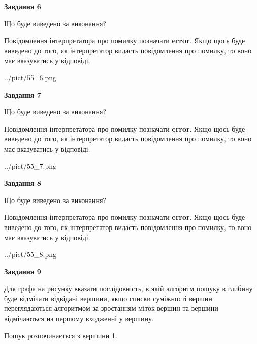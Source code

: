\documentclass[12pt, ukrainian]{article}
\begin{document}
{\begin {large}
{\begin {center}\textbf{Завдання 6}\end {center}}\par
Що буде виведено за виконання?

Повідомлення інтерпретатора про помилку позначати \textbf{error}.
Якщо щось буде виведено до того, як інтерпретатор видасть повідомлення про помилку, 
то воно має вказуватись у відповіді. \par


\begin{center}
	{../pict/55_6.png}
\end{center}
\newpage

{\begin {center}\textbf{Завдання 7}\end {center}}\par
Що буде виведено за виконання?

Повідомлення інтерпретатора про помилку позначати \textbf{error}.
Якщо щось буде виведено до того, як інтерпретатор видасть повідомлення про помилку, 
то воно має вказуватись у відповіді. \par


\begin{center}
	{../pict/55_7.png}
\end{center}
\newpage

{\begin {center}\textbf{Завдання 8}\end {center}}\par
Що буде виведено за виконання?

Повідомлення інтерпретатора про помилку позначати \textbf{error}.
Якщо щось буде виведено до того, як інтерпретатор видасть повідомлення про помилку, 
то воно має вказуватись у відповіді. \par


\begin{center}
	{../pict/55_8.png}
\end{center}
\newpage

{\begin {center}\textbf{Завдання 9}\end {center}}\par
Для графа на рисунку вказати послідовність, в якій алгоритм пошуку в глибину буде відмічати відвідані вершини, якщо списки суміжності вершин переглядаються алгоритмом за зростанням міток вершин та вершини відмічаються на першому вход\-женні у вершину.\par
Пошук розпочинається з вершини 1.\par


\end{large}}
\end{document}
